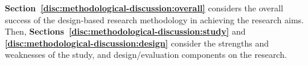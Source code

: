 \textbf{Section~\ref{disc:methodological-discussion:overall}} considers the overall success of the design-based research methodology in achieving the research aims.  Then, \textbf{Sections~\ref{disc:methodological-discussion:study}} and  \textbf{\ref{disc:methodological-discussion:design}} consider the strengths and weaknesses of the study, and design/evaluation components on the research.




